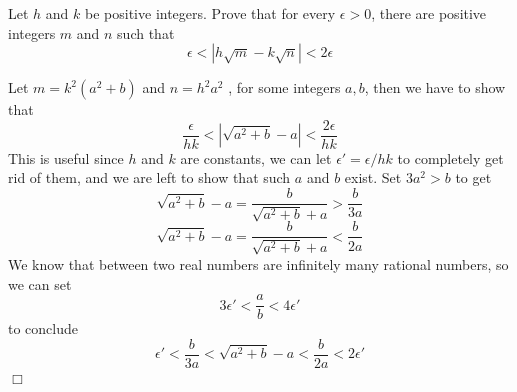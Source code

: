 \documentclass[12pt]{article}
\newcounter{problem}
\begin{document}
\begin{problem}[D][9][Putnam 2011/B1]
    Let $h$ and $k$ be positive integers. Prove that for every $\epsilon > 0$, there are positive integers $m$ and $n$ such that
    $$\epsilon < |h\sqrt{m} -k\sqrt{n}| < 2\epsilon$$
\end{problem}   

\begin{solution}
      Let $m=k^2(a^2+b)$ and $n=h^2a^2$ , for some integers $a,b$, then we have to show that
      $$\frac{\epsilon}{hk} < |\sqrt{a^2+b}-a|<\frac{2\epsilon}{hk}$$
      This is useful since $h$ and $k$ are constants, we can let $\epsilon' = \epsilon/hk$ to completely get rid of them, and we are left to show that such $a$ and $b$ exist. Set $3a^2>b$ to get
      $$\sqrt{a^2+b}-a = \frac{b}{\sqrt{a^2+b}+a} > \frac{b}{3a}$$
      $$\sqrt{a^2+b}-a = \frac{b}{\sqrt{a^2+b}+a} < \frac{b}{2a}$$
      We know that between two real numbers are infinitely many rational numbers, so we can set 
      $$3\epsilon' < \frac{a}{b} < 4\epsilon'$$ 
      to conclude
      $$\epsilon' < \frac{b}{3a} < \sqrt{a^2+b}-a < \frac{b}{2a} < 2\epsilon'$$
      $\Box$
\end{solution}
\end{document}
